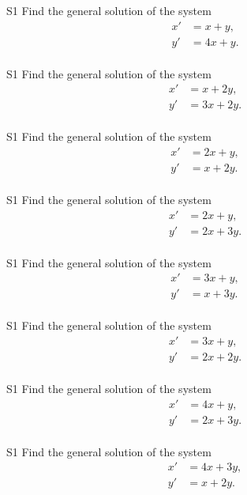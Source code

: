 \begin{problem}{S1}
Find the general solution of the system
\begin{align*}
x' & = x + y,\\
y' & = 4x + y.\\
\end{align*}
\end{problem}

\begin{problem}{S1}
Find the general solution of the system
\begin{align*}
x' & = x + 2y,\\
y' & = 3x + 2y.\\
\end{align*}
\end{problem}

\begin{problem}{S1}
Find the general solution of the system
\begin{align*}
x' & = 2x + y,\\
y' & = x + 2y.\\
\end{align*}
\end{problem}

\begin{problem}{S1}
Find the general solution of the system
\begin{align*}
x' & = 2x +  y,\\
y' & = 2x + 3y.\\
\end{align*}
\end{problem}

\begin{problem}{S1}
Find the general solution of the system
\begin{align*}
x' & = 3x + y,\\
y' & = x +  3y.\\
\end{align*}
\end{problem}

\begin{problem}{S1}
Find the general solution of the system
\begin{align*}
x' & = 3x + y,\\
y' & = 2x + 2y.\\
\end{align*}
\end{problem}

\begin{problem}{S1}
Find the general solution of the system
\begin{align*}
x' & = 4x + y,\\
y' & = 2x + 3y.\\
\end{align*}
\end{problem}

\begin{problem}{S1}
Find the general solution of the system
\begin{align*}
x' & = 4x + 3y,\\
y' & = x + 2y.\\
\end{align*}
\end{problem}

